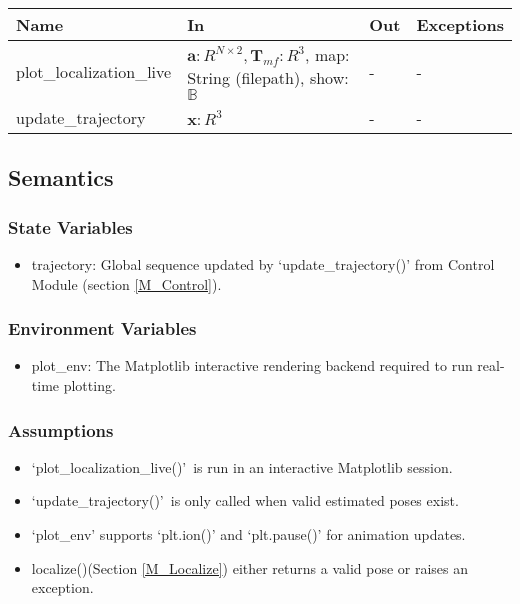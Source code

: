 \documentclass[12pt, titlepage]{article}
\begin{document}
\begin{center}
\begin{tabular}{p{4cm} p{6cm} p{4cm} p{2cm}}
\hline
\textbf{Name} & \textbf{In} & \textbf{Out} & \textbf{Exceptions} \\
\hline
plot\_localization\_live & $\mathbf{a}: R^{N \times 2}, \mathbf{T}_{mf}: R^3$, map: String (filepath), show: $\mathbb{B}$  & - & - \\
\hline
update\_trajectory &  $\hat{\mathbf{x}}: R^3$ & - & - \\
\hline
\end{tabular}
\end{center}

\subsection{Semantics}

\subsubsection{State Variables}
\begin{itemize}
  \item trajectory: Global sequence updated by `update\_trajectory()' from Control Module (section \ref{M_Control}).
\end{itemize}

\subsubsection{Environment Variables}
\begin{itemize}
  \item plot\_env: The Matplotlib interactive rendering backend required to run real-time plotting.
\end{itemize}

\subsubsection{Assumptions}
\begin{itemize}
  \item \lq plot\_localization\_live()\rq~is run in an interactive Matplotlib session.
  \item \lq update\_trajectory()\rq~is only called when valid estimated poses exist.
  \item `plot\_env' supports `plt.ion()' and `plt.pause()' for animation updates.
  \item localize()(Section \ref{M_Localize}) either returns a valid pose or raises an exception.
\end{itemize}
\end{document}
